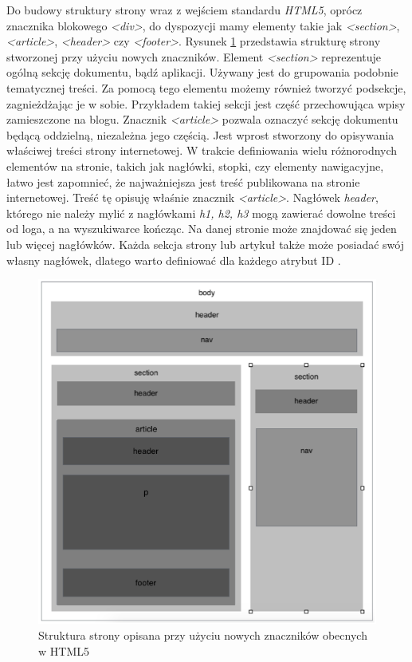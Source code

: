 \documentclass{iiuwb}
\begin{document}
Do budowy struktury strony wraz z wejściem standardu \textit{HTML5}, oprócz znacznika blokowego \textit{<div>}, do dyspozycji mamy elementy takie jak \textit{<section>}, \textit{<article>}, \textit{<header>} czy \textit{<footer>}. Rysunek \ref{fig:Struktura strony } przedstawia strukturę strony stworzonej przy użyciu nowych znaczników. Element \textit{<section>} reprezentuje ogólną sekcję dokumentu, bądź aplikacji. Używany jest do grupowania podobnie tematycznej treści. Za pomocą tego elementu możemy również tworzyć podsekcje, zagnieżdżając je w sobie. Przykładem takiej sekcji jest część przechowująca wpisy zamieszczone na blogu. Znacznik \textit{<article>} pozwala oznaczyć sekcję dokumentu będącą oddzielną, niezależna jego częścią. Jest wprost stworzony do opisywania właściwej treści strony internetowej. W trakcie definiowania wielu różnorodnych elementów na stronie, takich jak nagłówki, stopki, czy elementy nawigacyjne, łatwo jest zapomnieć, że najważniejsza jest treść publikowana na stronie internetowej. Treść tę opisuję właśnie znacznik \textit{<article>}. Nagłówek \textit{header}, którego nie należy mylić z nagłówkami \textit{h1, h2, h3} mogą zawierać dowolne treści od loga, a na wyszukiwarce kończąc. Na danej stronie może znajdować się jeden lub więcej nagłówków. Każda sekcja strony lub artykuł także może posiadać swój własny nagłówek, dlatego warto definiować dla każdego atrybut ID \cite{Hogan:2010:H}.
\begin{figure}[!th]
\centering
\includegraphics[scale=.6]{image/StrukturaStrony.png}
\caption{Struktura strony opisana przy użyciu nowych znaczników obecnych w HTML5}
\label{fig:Struktura strony }
\end{figure}
\end{document}
